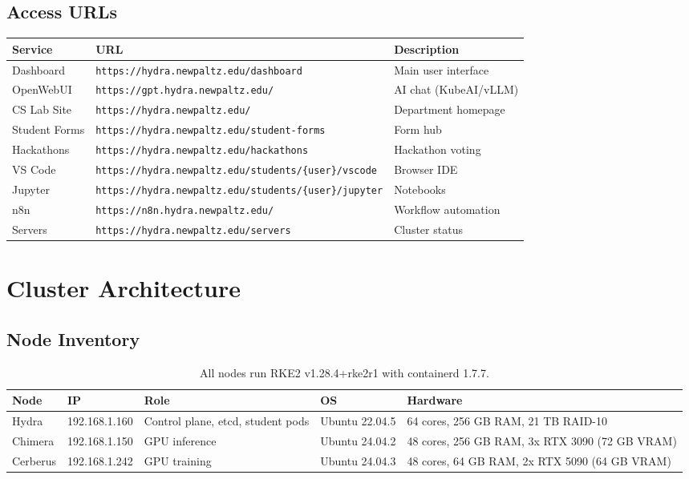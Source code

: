 \documentclass[11pt,a4paper]{article}
\begin{document}
\subsection{Access URLs}
\begin{table}[H]
\centering
\begin{tabular}{lll}
\toprule
\textbf{Service} & \textbf{URL} & \textbf{Description} \\
\midrule
Dashboard & \texttt{https://hydra.newpaltz.edu/dashboard} & Main user interface \\
OpenWebUI & \texttt{https://gpt.hydra.newpaltz.edu/} & AI chat (KubeAI/vLLM) \\
CS Lab Site & \texttt{https://hydra.newpaltz.edu/} & Department homepage \\
Student Forms & \texttt{https://hydra.newpaltz.edu/student-forms} & Form hub \\
Hackathons & \texttt{https://hydra.newpaltz.edu/hackathons} & Hackathon voting \\
VS Code & \texttt{https://hydra.newpaltz.edu/students/\{user\}/vscode} & Browser IDE \\
Jupyter & \texttt{https://hydra.newpaltz.edu/students/\{user\}/jupyter} & Notebooks \\
n8n & \texttt{https://n8n.hydra.newpaltz.edu/} & Workflow automation \\
Servers & \texttt{https://hydra.newpaltz.edu/servers} & Cluster status \\
\bottomrule
\end{tabular}
\end{table}

\section{Cluster Architecture}

\subsection{Node Inventory}

\begin{table}[H]
\centering
\begin{tabular}{llllp{4.5cm}}
\toprule
\textbf{Node} & \textbf{IP} & \textbf{Role} & \textbf{OS} & \textbf{Hardware} \\
\midrule
Hydra & 192.168.1.160 & Control plane, etcd, student pods & Ubuntu 22.04.5 & 64 cores, 256 GB RAM, 21 TB RAID-10 \\
Chimera & 192.168.1.150 & GPU inference & Ubuntu 24.04.2 & 48 cores, 256 GB RAM, 3x RTX 3090 (72 GB VRAM) \\
Cerberus & 192.168.1.242 & GPU training & Ubuntu 24.04.3 & 48 cores, 64 GB RAM, 2x RTX 5090 (64 GB VRAM) \\
\bottomrule
\end{tabular}
\caption{All nodes run RKE2 v1.28.4+rke2r1 with containerd 1.7.7.}
\end{table}
\end{document}
